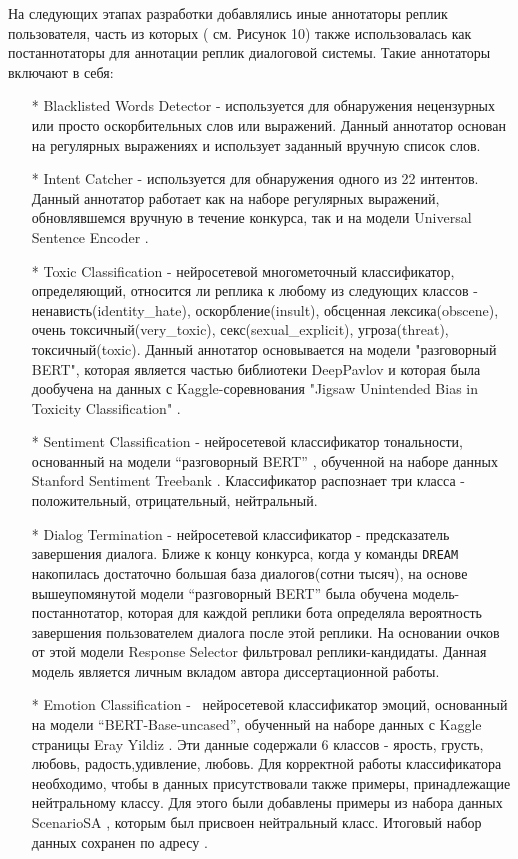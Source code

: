 На следующих этапах разработки добавлялись иные аннотаторы реплик пользователя, часть из которых ( см. Рисунок 10) также использовалась как постаннотаторы для аннотации реплик диалоговой системы. Такие аннотаторы включают в себя:
\begin{itemize}
\item[*] Blacklisted Words Detector - используется для обнаружения нецензурных или просто оскорбительных слов или выражений. Данный аннотатор основан на регулярных выражениях и использует заданный вручную список слов.

\item[*] Intent Catcher - используется для обнаружения одного из 22 интентов. Данный аннотатор работает как на наборе регулярных выражений, обновлявшемся вручную в течение конкурса, так и на модели Universal Sentence Encoder \cite{cer_2018}.

\item[*] Toxic Classification - нейросетевой многометочный классификатор, определяющий, относится ли реплика к любому из следующих классов - ненависть(identity\_hate), оскорбление(insult), обсценная лексика(obscene), очень токсичный(very\_toxic), секс(sexual\_explicit), угроза(threat), токсичный(toxic). Данный аннотатор основывается на модели "разговорный BERT"\cite{dp_conv_bert}, которая является частью библиотеки DeepPavlov и которая была дообучена на данных с Kaggle-соревнования "Jigsaw Unintended Bias in Toxicity Classification" \cite{toxic_kaggle}.

\item[*] Sentiment Classification - нейросетевой классификатор тональности, основанный на модели “разговорный BERT” \cite{na_website_ndn}, обученной на наборе данных Stanford Sentiment Treebank \cite{sst}. Классификатор распознает три класса - положительный, отрицательный, нейтральный.

\item[*] Dialog Termination - нейросетевой классификатор - предсказатель завершения диалога. Ближе к концу конкурса, когда у команды \texttt{DREAM} накопилась достаточно большая база диалогов(сотни тысяч), на основе вышеупомянутой модели “разговорный BERT” была обучена модель-постаннотатор, которая для каждой реплики бота определяла вероятность завершения пользователем диалога после этой реплики. На основании очков от этой модели Response Selector фильтровал реплики-кандидаты. Данная модель является личным вкладом автора диссертационной работы.

\item[*] Emotion Classification -  нейросетевой классификатор эмоций, основанный на модели “BERT-Base-uncased”, обученный на наборе данных с Kaggle страницы Eray Yildiz \cite{na_website_ndp_emo}. Эти данные содержали 6 классов - ярость, грусть, любовь, радость,удивление, любовь. Для корректной работы классификатора необходимо, чтобы в данных присутствовали также примеры, принадлежащие нейтральному классу. Для этого были добавлены примеры из набора данных ScenarioSA \cite{scenariosa}, которым был присвоен нейтральный класс. Итоговый набор данных сохранен по адресу \cite{na_website_ndo_emo}.
\end{itemize}
